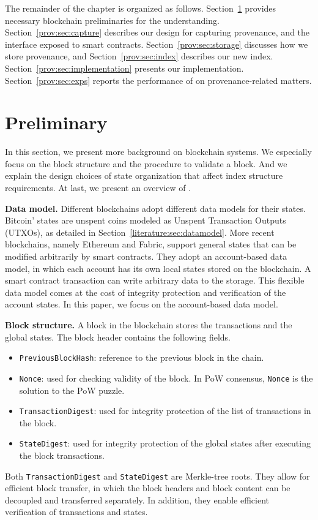The remainder of the chapter is organized as follows. Section~\ref{prov:sec:background} provides necessary blockchain preliminaries for the understanding. Section~\ref{prov:sec:capture} describes our design for capturing provenance, and the interface
exposed to smart contracts. Section~\ref{prov:sec:storage} discusses how we store provenance, and
Section~\ref{prov:sec:index} describes our new index. Section~\ref{prov:sec:implementation} presents our
implementation. Section~\ref{prov:sec:exps} reports the performance of {\fs} on provenance-related matters. 

\section{Preliminary}
\label{prov:sec:background}
In this section, we present more background on blockchain systems.
We especially focus on the block structure and the procedure to validate a block. 
And we explain the design choices of state organization that affect index structure requirements.
At last, we present an overview of {\fs}. 

\textbf{Data model.} Different blockchains adopt different data models for their states. Bitcoin' states
are unspent coins modeled as Unspent Transaction Outputs (UTXOs), as detailed in Section~\ref{literature:sec:datamodel}. More recent blockchains, namely Ethereum and Fabric, support general states that can be modified arbitrarily
by smart contracts.  They adopt an account-based data model, in which each account has its own local states
stored on the blockchain. A smart contract transaction can write arbitrary data to the storage. This flexible
data model comes at the cost of integrity protection and verification of the account states. In this paper, we
focus on the account-based data model.

\textbf{Block structure.} A block in the blockchain stores the transactions and the global states.
The block header contains the following fields.  
\begin{itemize} 
    \item \texttt{PreviousBlockHash}: reference to the previous block in the chain. 
    \item \texttt{Nonce}: used for checking validity of the block. In PoW consensus, \texttt{Nonce} is the solution to the PoW puzzle. 
    \item \texttt{TransactionDigest}: used for integrity protection of the list of transactions in the block. 
    \item \texttt{StateDigest}: used for integrity protection of the global states after executing the block transactions. 
\end{itemize}
Both \texttt{TransactionDigest} and \texttt{StateDigest} are Merkle-tree roots. They allow for efficient block
transfer, in which the block headers and block content can be decoupled and transferred separately. In
addition, they enable efficient verification of transactions and states.


